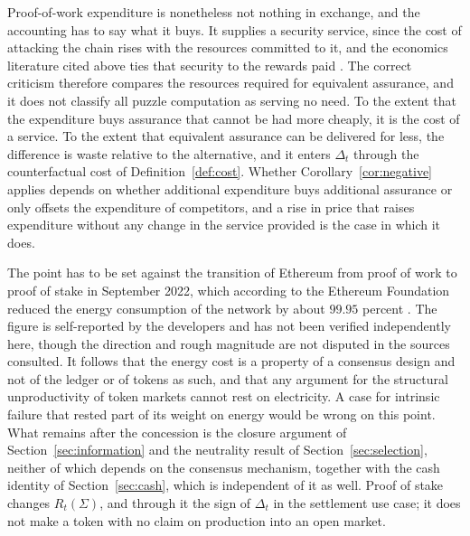 \documentclass[11pt]{article}
\theoremstyle{remark}
\begin{document}
Proof-of-work expenditure is nonetheless not nothing in exchange, and the accounting has to say what it buys. It supplies a security service, since the cost of attacking the chain rises with the resources committed to it, and the economics literature cited above ties that security to the rewards paid \cite{budish2018,auer2019}. The correct criticism therefore compares the resources required for equivalent assurance, and it does not classify all puzzle computation as serving no need. To the extent that the expenditure buys assurance that cannot be had more cheaply, it is the cost of a service. To the extent that equivalent assurance can be delivered for less, the difference is waste relative to the alternative, and it enters $\Delta_t$ through the counterfactual cost of Definition~\ref{def:cost}. Whether Corollary~\ref{cor:negative} applies depends on whether additional expenditure buys additional assurance or only offsets the expenditure of competitors, and a rise in price that raises expenditure without any change in the service provided is the case in which it does.

The point has to be set against the transition of Ethereum from proof of work to proof of stake in September 2022, which according to the Ethereum Foundation reduced the energy consumption of the network by about $99.95$ percent \cite{ethereum2022}. The figure is self-reported by the developers and has not been verified independently here, though the direction and rough magnitude are not disputed in the sources consulted. It follows that the energy cost is a property of a consensus design and not of the ledger or of tokens as such, and that any argument for the structural unproductivity of token markets cannot rest on electricity. A case for intrinsic failure that rested part of its weight on energy would be wrong on this point. What remains after the concession is the closure argument of Section~\ref{sec:information} and the neutrality result of Section~\ref{sec:selection}, neither of which depends on the consensus mechanism, together with the cash identity of Section~\ref{sec:cash}, which is independent of it as well. Proof of stake changes $R_t(\Sigma)$, and through it the sign of $\Delta_t$ in the settlement use case; it does not make a token with no claim on production into an open market.
\end{document}
